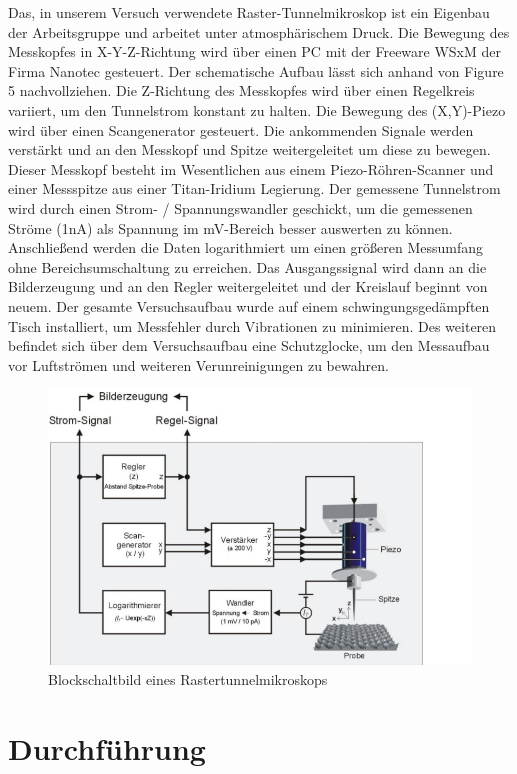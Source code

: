 \documentclass[10pt,a4paper]{article}
\begin{document}
Das, in unserem Versuch verwendete Raster-Tunnelmikroskop ist ein Eigenbau der Arbeitsgruppe und arbeitet unter atmosphärischem Druck. Die Bewegung des Messkopfes in X-Y-Z-Richtung wird über einen PC mit der Freeware WSxM der Firma Nanotec gesteuert.  Der schematische Aufbau lässt sich anhand von Figure 5 nachvollziehen.  Die Z-Richtung des Messkopfes wird über einen Regelkreis variiert, um den Tunnelstrom konstant zu halten. Die Bewegung des (X,Y)-Piezo wird über einen Scangenerator gesteuert. Die ankommenden Signale werden verstärkt und an den Messkopf und Spitze weitergeleitet um diese zu bewegen.  Dieser Messkopf besteht im Wesentlichen aus einem Piezo-Röhren-Scanner und einer Messspitze aus einer Titan-Iridium Legierung. Der gemessene Tunnelstrom wird durch einen Strom- / Spannungswandler geschickt, um die gemessenen Ströme (1nA) als Spannung im mV-Bereich besser auswerten zu können. Anschließend werden die Daten logarithmiert um einen größeren Messumfang ohne Bereichsumschaltung zu erreichen. Das Ausgangssignal wird dann an die Bilderzeugung und an den Regler weitergeleitet und der Kreislauf beginnt von neuem. Der gesamte Versuchsaufbau wurde auf einem schwingungsgedämpften Tisch installiert, um Messfehler durch Vibrationen zu minimieren. Des weiteren befindet sich über dem Versuchsaufbau eine Schutzglocke, um den Messaufbau vor Luftströmen und weiteren Verunreinigungen zu bewahren.

\begin{figure}[h]
	\includegraphics[scale = 0.6]{aufbau.png}
	\centering
	\caption{Blockschaltbild eines Rastertunnelmikroskops}
	\label{diagramm_aufspaltung}
\end{figure}

\section{Durchführung}
\end{document}
